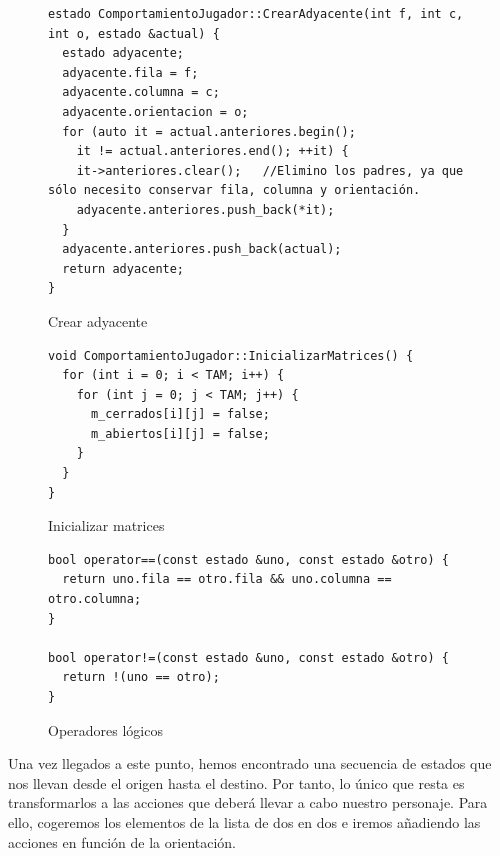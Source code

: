 \documentclass[12pt,spanish]{article}
\begin{document}
\begin{figure}[H]
\centering
\begin{verbatim}
estado ComportamientoJugador::CrearAdyacente(int f, int c, int o, estado &actual) {
  estado adyacente;
  adyacente.fila = f;
  adyacente.columna = c;
  adyacente.orientacion = o;
  for (auto it = actual.anteriores.begin(); 
    it != actual.anteriores.end(); ++it) {
    it->anteriores.clear();   //Elimino los padres, ya que sólo necesito conservar fila, columna y orientación.
    adyacente.anteriores.push_back(*it);
  }
  adyacente.anteriores.push_back(actual);
  return adyacente;
}
\end{verbatim}
\caption{Crear adyacente}
\end{figure}

\begin{figure}[H]
\centering
\begin{verbatim}
void ComportamientoJugador::InicializarMatrices() {
  for (int i = 0; i < TAM; i++) {
    for (int j = 0; j < TAM; j++) {
      m_cerrados[i][j] = false;
      m_abiertos[i][j] = false;
    }
  }
}
\end{verbatim}
\caption{Inicializar matrices}
\end{figure}

\begin{figure}[H]
\centering
\begin{verbatim}
bool operator==(const estado &uno, const estado &otro) {
  return uno.fila == otro.fila && uno.columna == otro.columna;
}

bool operator!=(const estado &uno, const estado &otro) {
  return !(uno == otro);
}
\end{verbatim}
\caption{Operadores lógicos}
\end{figure}

Una vez llegados a este punto, hemos encontrado una secuencia de estados que nos llevan desde el origen hasta el destino. Por tanto, lo único que resta es transformarlos a las acciones que deberá llevar a cabo nuestro personaje. Para ello, cogeremos los elementos de la lista de dos en dos e iremos añadiendo las acciones en función de la orientación.
\end{document}

